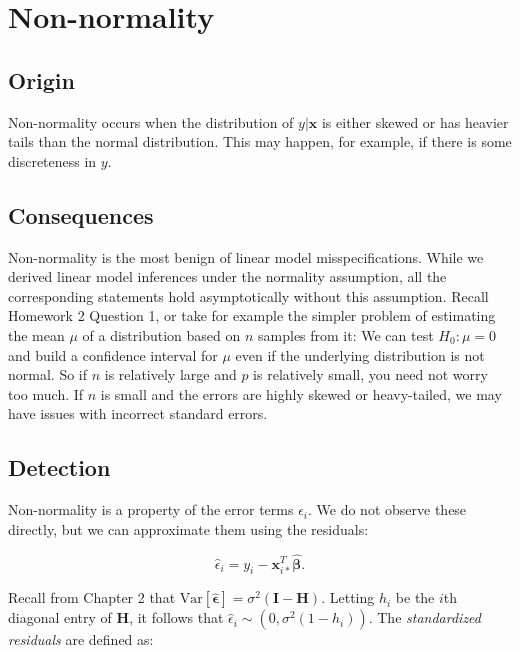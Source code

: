 \documentclass[
  11pt,
  letterpaper,
  oneside]{book}
\theoremstyle{definition}
\theoremstyle{plain}
\theoremstyle{plain}
\theoremstyle{plain}
\theoremstyle{remark}
\begin{document}
\hypertarget{sec-non-normality}{%
\section{Non-normality}\label{sec-non-normality}}

\hypertarget{origin}{%
\subsection{Origin}\label{origin}}

Non-normality occurs when the distribution of \(y|\boldsymbol{x}\) is
either skewed or has heavier tails than the normal distribution. This
may happen, for example, if there is some discreteness in \(y\).

\hypertarget{consequences}{%
\subsection{Consequences}\label{consequences}}

Non-normality is the most benign of linear model misspecifications.
While we derived linear model inferences under the normality assumption,
all the corresponding statements hold asymptotically without this
assumption. Recall Homework 2 Question 1, or take for example the
simpler problem of estimating the mean \(\mu\) of a distribution based
on \(n\) samples from it: We can test \(H_0: \mu = 0\) and build a
confidence interval for \(\mu\) even if the underlying distribution is
not normal. So if \(n\) is relatively large and \(p\) is relatively
small, you need not worry too much. If \(n\) is small and the errors are
highly skewed or heavy-tailed, we may have issues with incorrect
standard errors.

\hypertarget{detection}{%
\subsection{Detection}\label{detection}}

Non-normality is a property of the error terms \(\epsilon_i\). We do not
observe these directly, but we can approximate them using the residuals:

\[
\widehat{\epsilon}_i = y_i - \boldsymbol{x}_{i*}^T \boldsymbol{\widehat{\beta}}.
\]

Recall from Chapter 2 that
\(\text{Var}[\boldsymbol{\widehat{\epsilon}}] = \sigma^2(\boldsymbol{I} - \boldsymbol{H})\).
Letting \(h_i\) be the \(i\)th diagonal entry of \(\boldsymbol{H}\), it
follows that \(\widehat{\epsilon}_i \sim (0, \sigma^2(1-h_i))\). The
\emph{standardized residuals} are defined as:
\end{document}
